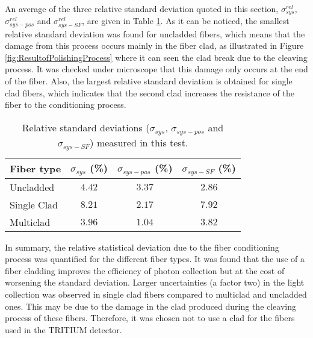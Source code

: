
An average of the three relative standard deviation quoted in this section, $\sigma^{rel}_{sys}$, $\sigma^{rel}_{sys-pos}$ and $\sigma^{rel}_{sys-SF}$,  are given in Table \ref{tab:RelativeStandardDeviations}. As it can be noticed, the smallest relative standard deviation was found for uncladded fibers, which means that the damage from this process occurs mainly in the fiber clad, as illustrated in Figure \ref{fig:ResultofPolishingProcess} where it can seen the clad break due to the cleaving process. It was checked under microscope that this damage only occurs at the end of the fiber. Also, the largest relative standard deviation is obtained for single clad fibers, which indicates that the second clad increases the resistance of the fiber to the conditioning process.

\begin{table}[htbp]
\centering{}%
\begin{tabular}{lccc}
\toprule 
Fiber type & $\sigma_{sys}$ (\%) & $\sigma_{sys-pos}$ (\%) & $\sigma_{sys-SF}$ (\%) \tabularnewline
\midrule
\midrule 
Uncladded & $4.42$ & $3.37$ & $2.86$ \tabularnewline
Single Clad & $8.21$ & $2.17$ & $7.92$ \tabularnewline
Multiclad & $3.96$ & $1.04$ & $3.82$ \tabularnewline
\bottomrule
\end{tabular}
\caption{Relative standard deviations ($\sigma_{sys}$, $\sigma_{sys-pos}$ and $\sigma_{sys-SF}$) measured in this test.}
\label{tab:RelativeStandardDeviations}
\end{table}

In summary, the relative statistical deviation due to the fiber conditioning process was quantified for the different fiber types. It was found that the use of a fiber cladding improves the efficiency of photon collection but at the cost of worsening the standard deviation. Larger uncertainties (a factor two) in the light collection was observed in single clad fibers compared to multiclad and uncladded ones. This may be due to the damage in the clad produced during the cleaving process of these fibers. Therefore, it was chosen not to use a clad for the fibers used in the TRITIUM detector.

